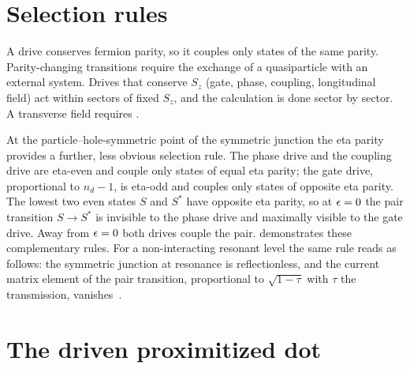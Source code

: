 \section{Selection rules}\label{sec:selection}

A drive conserves fermion parity, so it couples only states of the same parity.
Parity-changing transitions require the exchange of a quasiparticle with an external
system. Drives that conserve $S_z$ (gate, phase, coupling, longitudinal field) act within
sectors of fixed $S_z$, and the calculation is done sector by sector. A transverse field
requires .

At the particle--hole-symmetric point of the symmetric junction the eta parity provides a
further, less obvious selection rule. The phase drive and the coupling drive are eta-even and
couple only states of equal eta parity; the gate drive, proportional to $n_d-1$, is eta-odd
and couples only states of opposite eta parity. The lowest two even states $S$ and $S^*$
have opposite eta parity, so at $\epsilon=0$ the pair transition $S\to S^*$ is invisible to the
phase drive and maximally visible to the gate drive. Away from $\epsilon=0$ both drives couple
the pair.  demonstrates these complementary rules. For a non-interacting
resonant level the same rule reads as follows: the symmetric junction at resonance is
reflectionless, and the current matrix element of the pair transition, proportional to
$\sqrt{1-\tau}$ with $\tau$ the transmission, vanishes~\cite{zazunov2003andreev,kos2013frequencydependent}.

\section{The driven proximitized dot}\label{sec:driven-largegap}

